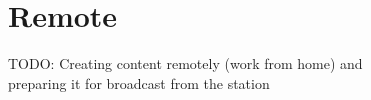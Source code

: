 % 

\chapter{Remote}
TODO: Creating content remotely (work from home) and \\ preparing it for broadcast from the station

% 
